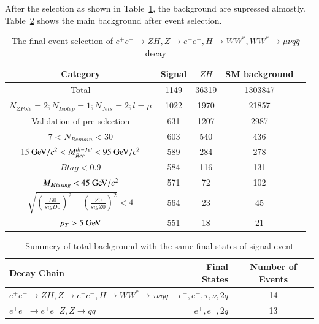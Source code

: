 \documentclass[11pt,a4paper]{cepcnote}
\begin{document}
After the selection as shown in Table~\ref{tab:eeuvqqCutchain}, the background are supressed almostly. 
Table~\ref{tab:uuuvqqbkg} shows the main background after event selection.
\begin{table}[H]
  \begin{center}
    \begin{tabular}{ccccc}
      \hline \hline
      \multicolumn{1}{c}{Category} & \multicolumn{1}{c}{Signal}&\multicolumn{1}{c}{$ZH$} background&\multicolumn{1}{c}{SM background}\\ 
      \hline
      Total 	      	 									&   1149	& 36319	& 1303847\\
      $N_{ZPole}=2; N_{Isolep}=1; N_{Jets} =2; l = \mu$		&   1022	& 1970	& 21857\\
	  Validation of pre-selection					   		&   631 	& 1207	& 2987\\
	  $7 < N_{Remain} < 30$									&	603		& 540	& 436\\
	  $15\gev/c^2 < M_{Rec}^{di-Jet} < 95\gev/c^2 $			&	589		& 284	& 278\\
	  $Btag < 0.9$											&	584		& 116	& 131\\
	  $M_{Missing} < 45\gev/c^2$							&   571		& 72	& 102\\
	  $\sqrt{(\frac{D0}{sigD0})^2+(\frac{Z0}{sigZ0})^2} < 4$&	564  	& 23 	& 45\\
	  $p_T > 5\gev$											&	551		& 18	& 21	\\	
      \hline \hline
    \end{tabular}
  \caption[Monte Carlo purities in the single lepton sample]{%
    The final event selection of $e^+e^-\rightarrow ZH, Z\rightarrow e^+e^-, H\rightarrow WW^*, WW^*\rightarrow \mu\nu q\bar{q}$ decay}
  \label{tab:eeuvqqCutchain}
  \end{center}
\end{table}
\begin{table}[H]
\begin{center}
\begin{tabular}{lrc}
\hline\hline
Decay Chain	& Final States 	&	Number of Events	\\
\hline
$e^+e^-\rightarrow ZH, Z\rightarrow e^+e^-, H\rightarrow WW^*\rightarrow \tau\nu q\bar{q}$ & $e^+, e^-, \tau, \nu, 2q $	&	14\\
$e^+e^-\rightarrow e^+e^-Z, Z\rightarrow qq$ 					& $e^+, e^-, 2q$								&	13\\
\hline\hline
\end{tabular}
\caption{Summery of total background with the same final states of signal event}
\label{tab:uuuvqqbkg}
\end{center}
\end{table}
\end{document}
